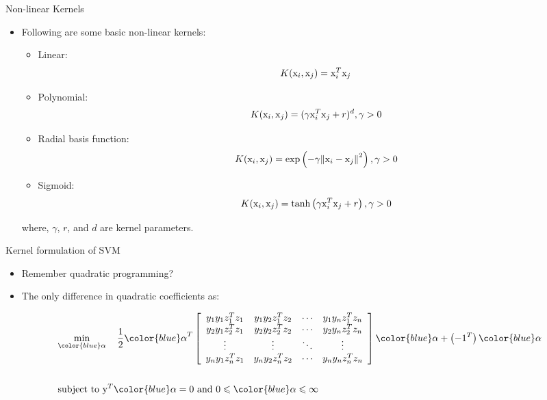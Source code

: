 \begin{frame}{Non-linear Kernels}
\begin{itemize}
\item Following are some basic non-linear kernels:
\begin{itemize}
\item Linear: 
\[{K({{{\rm x}}_i},{{{\rm x}}_j}) = {\rm x}_i^{T}{{\rm x}_j}}\]
\item Polynomial: 
\[K({{\rm x}_i},{{\rm x}_j}) = {({\gamma} {\rm x}_i^{T}{{\rm x}_j} + r)^{d}},{\gamma}  > 0\]
\item Radial basis function: 
\[K({{\rm x}_i},{{\rm x}_j}) = \exp \left( { - {\gamma} {{\left\| {{{\rm x}_i} - {{\rm x}_j}} \right\|}^2}} \right),{\gamma}  > 0\]
\item Sigmoid: 
\[K({{\rm x}_i},{{\rm x}_j}) = \tanh \left( {{\gamma} {\rm x}_i^{T}{{\rm x}_j} + r} \right),{\gamma}  > 0\]
\end{itemize}
where, $\gamma$, $r$, and $d$  are kernel parameters. 
\end{itemize}
\end{frame}

\begin{frame}{Kernel formulation of SVM}
\begin{itemize}
\item Remember quadratic programming?
\item The only difference  in quadratic coefficients as:
\end{itemize}
\[\begin{gathered}
  \mathop {\min }\limits_{\color{blue}\alpha}  ~~~ \frac{1}{2}{{\color{blue}\alpha}  ^T}\left[ {\begin{array}{*{20}{c}}
  {{y_1}{y_1}z_1^T{z_1}}&{{y_1}{y_2}z_1^T{z_2}}&{\cdots}&{{y_1}{y_n}z_1^T{z_n}} \\ 
  {{y_2}{y_1}z_2^T{z_1}}&{{y_2}{y_2}z_2^T{z_2}}&{\cdots}&{{y_2}{y_n}z_2^T{z_n}} \\ 
  {\vdots}&{\vdots}&{\ddots}&{\vdots} \\ 
  {{y_n}{y_1}z_n^T{z_1}}&{{y_n}{y_2}z_n^T{z_2}}&{\cdots}&{{y_n}{y_n}z_n^T{z_n}} 
\end{array}} \right]{\color{blue}\alpha}  + \left( { - {1^T}} \right){\color{blue}\alpha}  \hfill \\\\
  \text{subject to   }{{\rm y}^T}{\color{blue}\alpha}   = 0\text{   and   }0 \leqslant {\color{blue}\alpha}   \leqslant \infty  \hfill \\ 
\end{gathered} \]
\end{frame}


